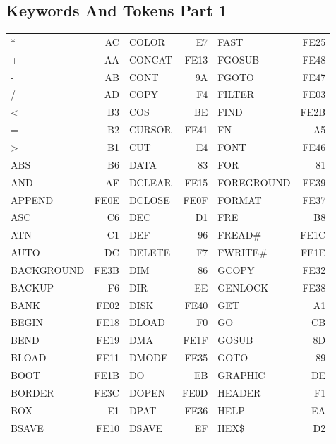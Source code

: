 \subsection{Keywords And Tokens Part 1}
{\ttfamily
\setlength{\tabcolsep}{1mm}
\begin{tabular}{|p{2.2cm}r|p{2.2cm}r|p{2.2cm}r|}
\hline
*          &   AC &COLOR      &   E7 &FAST       & FE25 \\
+          &   AA &CONCAT     & FE13 &FGOSUB     & FE48 \\
-          &   AB &CONT       &   9A &FGOTO      & FE47 \\
/          &   AD &COPY       &   F4 &FILTER     & FE03 \\
<          &   B3 &COS        &   BE &FIND       & FE2B \\
=          &   B2 &CURSOR     & FE41 &FN         &   A5 \\
>          &   B1 &CUT        &   E4 &FONT       & FE46 \\
ABS        &   B6 &DATA       &   83 &FOR        &   81 \\
AND        &   AF &DCLEAR     & FE15 &FOREGROUND & FE39 \\
APPEND     & FE0E &DCLOSE     & FE0F &FORMAT     & FE37 \\
ASC        &   C6 &DEC        &   D1 &FRE        &   B8 \\
ATN        &   C1 &DEF        &   96 &FREAD\#    & FE1C \\
AUTO       &   DC &DELETE     &   F7 &FWRITE\#   & FE1E \\
BACKGROUND & FE3B &DIM        &   86 &GCOPY      & FE32 \\
BACKUP     &   F6 &DIR        &   EE &GENLOCK    & FE38 \\
BANK       & FE02 &DISK       & FE40 &GET        &   A1 \\
BEGIN      & FE18 &DLOAD      &   F0 &GO         &   CB \\
BEND       & FE19 &DMA        & FE1F &GOSUB      &   8D \\
BLOAD      & FE11 &DMODE      & FE35 &GOTO       &   89 \\
BOOT       & FE1B &DO         &   EB &GRAPHIC    &   DE \\
BORDER     & FE3C &DOPEN      & FE0D &HEADER     &   F1 \\
BOX        &   E1 &DPAT       & FE36 &HELP       &   EA \\
BSAVE      & FE10 &DSAVE      &   EF &HEX\$      &   D2 \\

\end{tabular}}
